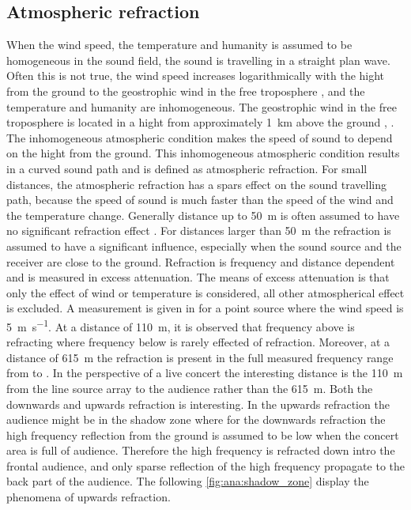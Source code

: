 \subsection{Atmospheric refraction} \label{sec:ana:atm_ref}
When the wind speed, the temperature and humanity is assumed to be homogeneous in the sound field, the sound is travelling in a straight plan wave. Often this is not true, the wind speed increases logarithmically with the hight from the ground to the geostrophic wind \citep{asmos_acous_2016} in the free troposphere \citep{spr_hand_book}, and the temperature and humanity are inhomogeneous. The geostrophic wind in the free troposphere is located in a hight from approximately \SI{1}{\kilo\meter} above the ground \citep{spr_hand_book}, \citep{geostrophic_wind}. The inhomogeneous atmospheric condition makes the speed of sound to depend on the hight from the ground. This inhomogeneous atmospheric condition results in a curved sound path and is defined as atmospheric refraction. For small distances, the atmospheric refraction has a spars effect on the sound travelling path, because the speed of sound is much faster than the speed of the wind and the temperature change. Generally distance up to \SI{50}{\meter} is often assumed to have no significant refraction effect \citep{effect_of_wind}. For distances larger than \SI{50}{\meter} the refraction is assumed to have a significant influence, especially when the sound source and the receiver are close to the ground. Refraction is frequency and distance dependent and is measured in \db excess attenuation. The means of excess attenuation is that only the effect of wind or temperature is considered, all other atmospherical effect is excluded. A measurement is given in \citep{review_of_sound} for a point source where the wind speed is \SI{5}{\meter\per\second}. At a distance of \SI{110}{\meter}, it is observed that frequency above  is refracting where frequency below is rarely effected of refraction. Moreover, at a distance of \SI{615}{\meter} the refraction is present in the full measured frequency range from  to . In the perspective of a live concert the interesting distance is the \SI{110}{\meter} from the line source array to the audience rather than the \SI{615}{\meter}. Both the downwards and upwards refraction is interesting. In the upwards refraction the audience might be in the shadow zone where for the downwards refraction the high frequency reflection from the ground is assumed to be low when the concert area is full of audience. Therefore the high frequency is refracted down intro the frontal audience, and only sparse reflection of the high frequency propagate to the back part of the audience. The following \autoref{fig:ana:shadow_zone} display the phenomena of upwards refraction.


